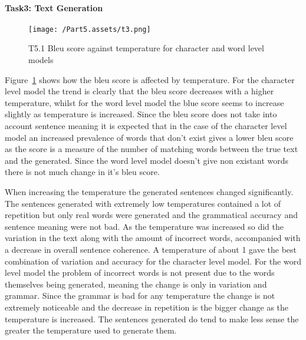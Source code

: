 \documentclass[10pt,twocolumn,letterpaper]{article}
\begin{document}
\paragraph{Task3: Text Generation}


\begin{figure}[ht]
    \begin{center}
        \texttt{[image: /Part5.assets/t3.png]}
        \caption{T5.1 Bleu score against temperature for character and word level models}\label{fig:t53}
        \vspace{-0.3cm}
    \end{center}
\end{figure}
Figure~\ref{fig:t53} shows how the bleu score is affected by temperature. For the character level model the trend is clearly that the bleu score decreases with a higher temperature, whilst for the word level model the blue score seems to increase slightly as temperature is increased. Since the bleu score does not take into account sentence meaning it is expected that in the case of the character level model an increased prevalence of words that don't exist gives a lower bleu score as the score is a measure of the number of matching words between the true text and the generated\cite{bleu}. Since the word level model doesn't give non existant words there is not much change in it's bleu score. 

When increasing the temperature the generated sentences changed significantly. The sentences generated with extremely low temperatures contained a lot of repetition but only real words were generated and the grammatical accuracy  and sentence meaning were not bad. As the temperature was increased so did the variation in the text along with the amount of incorrect words, accompanied with a decrease in overall sentence coherence. A temperature of about 1 gave the best combination of variation and accuracy for the character level model. For the word level model the problem of incorrect words is not present due to the words themselves being generated, meaning the change is only in variation and grammar. Since the grammar is bad for any temperature the change is not extremely noticeable and the decrease in repetition is the bigger change as the temperature is increased. The sentences generated do tend to make less sense the greater the temperature used to generate them.
\end{document}
